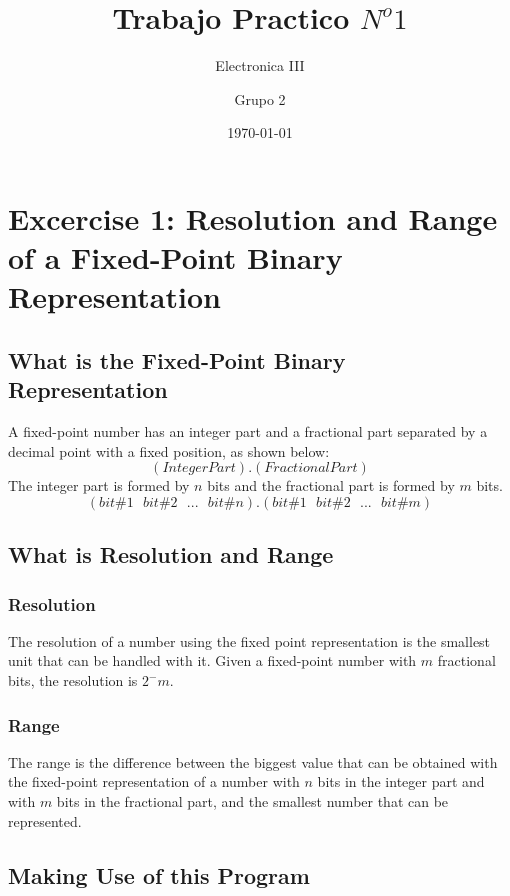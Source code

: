 \documentclass[a4paper,12pt]{report}
\begin{document}
\title{Trabajo Practico $N^o 1$}
\author{Electronica III}
\author{Grupo 2}
\date{\today} %

\maketitle

\section{Excercise 1: Resolution and Range of a Fixed-Point Binary Representation}

\subsection{What is the Fixed-Point Binary Representation}
A fixed-point number has an integer part and a fractional part separated by a decimal point with a fixed position, as shown below:
$$ (Integer Part).(Fractional Part)$$
The integer part is formed by $n$ bits and the fractional part is formed by $m$ bits.
$$ (bit \#1\ \ \ bit \#2\ \ \ ...\ \ \ bit \#n).(bit \#1\ \ \ bit \#2\ \ \ ...\ \ \ bit \#m)$$

\subsection{What is Resolution and Range}
\subsubsection{Resolution}
The resolution of a number using the fixed point representation is the smallest unit that can be handled with it.
Given a fixed-point number with $m$ fractional bits, the resolution is $2^-m$.
\subsubsection{Range}
The range is the difference between the biggest value that can be obtained with the fixed-point representation of a number with $n$ bits in the integer part and with $m$ bits in the fractional part, and the smallest number that can be represented.

\subsection{Making Use of this Program}
\end{document}
